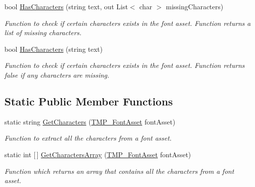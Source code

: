 \begin{DoxyCompactItemize}
bool \mbox{\hyperlink{class_t_m_pro_1_1_t_m_p___font_asset_a8db6e186c97502bee308dfc32f82aa92}{Has\+Characters}} (string text, out List$<$ char $>$ missing\+Characters)
\begin{DoxyCompactList}\small\item\em Function to check if certain characters exists in the font asset. Function returns a list of missing characters. \end{DoxyCompactList}\item 
bool \mbox{\hyperlink{class_t_m_pro_1_1_t_m_p___font_asset_a6432ab839d799b8e91d1c279946c03cf}{Has\+Characters}} (string text)
\begin{DoxyCompactList}\small\item\em Function to check if certain characters exists in the font asset. Function returns false if any characters are missing. \end{DoxyCompactList}\end{DoxyCompactItemize}
\subsection*{Static Public Member Functions}
\begin{DoxyCompactItemize}
\item 
static string \mbox{\hyperlink{class_t_m_pro_1_1_t_m_p___font_asset_a41da35d4c071829fecb1c8af92076969}{Get\+Characters}} (\mbox{\hyperlink{class_t_m_pro_1_1_t_m_p___font_asset}{T\+M\+P\+\_\+\+Font\+Asset}} font\+Asset)
\begin{DoxyCompactList}\small\item\em Function to extract all the characters from a font asset. \end{DoxyCompactList}\item 
static int \mbox{[}$\,$\mbox{]} \mbox{\hyperlink{class_t_m_pro_1_1_t_m_p___font_asset_a04f042c328bf55d9d675184132319112}{Get\+Characters\+Array}} (\mbox{\hyperlink{class_t_m_pro_1_1_t_m_p___font_asset}{T\+M\+P\+\_\+\+Font\+Asset}} font\+Asset)
\begin{DoxyCompactList}\small\item\em Function which returns an array that contains all the characters from a font asset. \end{DoxyCompactList}\end{DoxyCompactItemize}
